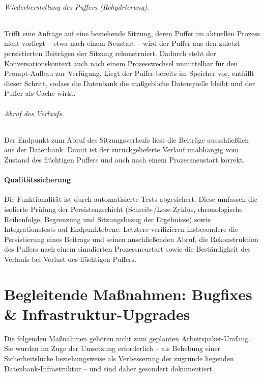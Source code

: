 \documentclass[11pt,a4paper]{article}
\begin{document}
\paragraph{Wiederherstellung des Puffers (Rehydrierung).} Trifft eine Anfrage auf
eine bestehende Sitzung, deren Puffer im aktuellen Prozess nicht vorliegt -- etwa
nach einem Neustart -- wird der Puffer aus den zuletzt persistierten Beiträgen der
Sitzung rekonstruiert. Dadurch steht der Konversationskontext auch nach einem
Prozesswechsel unmittelbar für den Prompt-Aufbau zur Verfügung. Liegt der Puffer
bereits im Speicher vor, entfällt dieser Schritt, sodass die Datenbank die
maßgebliche Datenquelle bleibt und der Puffer als Cache wirkt.

\paragraph{Abruf des Verlaufs.} Der Endpunkt zum Abruf des Sitzungsverlaufs liest
die Beiträge ausschließlich aus der Datenbank. Damit ist der zurückgelieferte
Verlauf unabhängig vom Zustand des flüchtigen Puffers und auch nach einem
Prozessneustart korrekt.

\subsection{Qualitätssicherung}

Die Funktionalität ist durch automatisierte Tests abgesichert. Diese umfassen die
isolierte Prüfung der Persistenzschicht (Schreib-/Lese-Zyklus, chronologische
Reihenfolge, Begrenzung und Sitzungsbezug der Ergebnisse) sowie Integrationstests
auf Endpunktebene. Letztere verifizieren insbesondere die Persistierung eines
Beitrags und seinen anschließenden Abruf, die Rekonstruktion des Puffers nach einem
simulierten Prozessneustart sowie die Beständigkeit des Verlaufs bei Verlust des
flüchtigen Puffers.

\part{Begleitende Maßnahmen: Bugfixes \& Infrastruktur-Upgrades}

\noindent
Die folgenden Maßnahmen gehören nicht zum geplanten Arbeitspaket-Umfang. Sie wurden im
Zuge der Umsetzung erforderlich -- als Behebung einer Sicherheitslücke beziehungsweise
als Verbesserung der zugrunde liegenden Datenbank-Infrastruktur -- und sind daher
gesondert dokumentiert.
\end{document}
